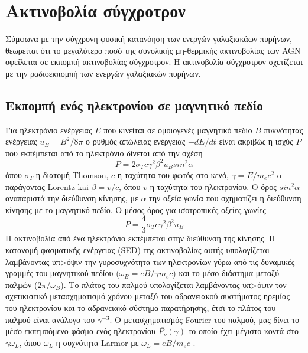 \section{Ακτινοβολία σύγχροτρον}

Σύμφωνα με την σύγχρονη φυσική κατανόηση των ενεργών γαλαξιακάων πυρήνων, θεωρείται ότι το μεγαλύτερο ποσό της συνολικής μη-θερμικής ακτινοβολίας των \textlatin{AGN} οφείλεται σε εκπομπή ακτινοβολίας σύγχροτρον. Η ακτινοβολία σύγχροτρον σχετίζεται με την ραδιοεκπομπή των ενεργών γαλαξιακών πυρήνων.

\subsection*{Εκπομπή ενός ηλεκτρονίου σε μαγνητικό πεδίο}

Για ηλεκτρόνιο ενέργειας $E$ που κινείται σε ομοιογενές μαγνητικό πεδίο $B$ πυκνότητας ενέργειας $u_B = B^2/8\pi$ ο ρυθμός απώλειας ενέργειας $-dE/dt$ είναι ακριβώς η ισχύς $P$ που εκπέμπεται από το ηλεκτρόνιο δίνεται από την σχέση\cite{netzer_2013} 
\begin{equation}
    P = 2\sigma_T c \gamma^2\beta^2u_Bsin^2\alpha
\end{equation}
όπου $\sigma_T$ η διατομή \textlatin{Thomson}, $c$ η ταχύτητα του φωτός στο κενό, $\gamma = E/m_e c^2$ o παράγοντας \textlatin{Lorentz} kai $\beta=v/c$, όπου $v$ η ταχύτητα του ηλεκτρονίου. Ο όρος $sin^2\alpha$ αναπαριστά την διεύθυνση κίνησης, με $\alpha$ την οξεία γωνία που σχηματίζει η διεύθυνση κίνησης με το μαγνητικό πεδίο. Ο μέσος όρος για ισοτροπικές οξείες γωνίες\cite{netzer_2013}
\begin{equation}
    \overline{P} = \frac{4}{3} \sigma_T c \gamma^2\beta^2u_B \label{eq:powerSynch} 
\end{equation}
Η ακτινοβολία από ένα ηλεκτρόνιο εκπέμπεται στην διεύθυνση της κίνησης. Η κατανομή φασματικής ενέργειας (\textlatin{SED}) της ακτινοβολίας αυτής υπολογίζεται λαμβάνοντας υπ>όψιν την γυροσυχνότητα των ηλεκτρονίων γύρω από τις δυναμικές γραμμές του μαγνητικού πεδίου ($\omega_B = eB/\gamma m_e c$) και το μέσο διάστημα μεταξύ παλμών ($2\pi /\omega_B$). Το πλάτος του παλμού υπολογίζεται λαμβάνοντας υπ>όψιν τον σχετικιστικό μετασχηματισμό χρόνου μεταξύ του αδρανειακού συστήματος ηρεμίας του ηλεκτρονίου και το αδρανειακό σύστημα παρατήρησης, έτσι το πλάτος του παλμού είναι ανάλογο του $\gamma^{-3}$. O μετασχηματισμός \textlatin{Fourier} του παλμού, μας δίνει το μέσο εκπεμπόμενο φάσμα ενός ηλεκτρονίου $\overline{P_\nu}(\gamma)$ το οποίο έχει μέγιστο κοντά στο $\gamma \omega_L$, όπου $\omega_L$ η συχνότητα \textlatin{Larmor} με $\omega_L = eB/m_ec$ \cite{netzer_2013}.

